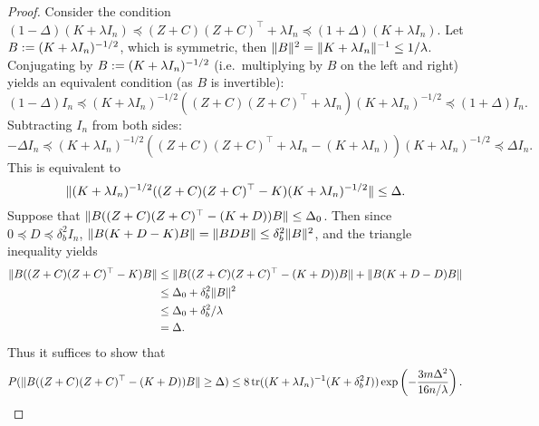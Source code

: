 \begin{proof}
  Consider the condition $(1 - \Delta)(K + \lambda I_n) \preceq (Z + C) (Z + C)^\top + \lambda I_n \preceq (1 +
  \Delta)(K + \lambda I_n)$.
  Let $B := (K + \lambda I_n)^{-1/2}$, which is symmetric, then $\|B\|^2 =
  \|K + \lambda I_n\|^{-1} \leq 1/\lambda$.
  Conjugating by $B := (K + \lambda I_n)^{-1/2}$ (i.e.\ multiplying by $B$ on the
  left and right) yields an equivalent condition (as $B$ is
  invertible):
  \begin{equation*}
    (1 - \Delta) I_n \preceq (K + \lambda I_n)^{-1/2} ((Z + C) (Z + C)^\top + \lambda I_n) (K + \lambda I_n)^{-1/2} \preceq (1 +
    \Delta) I_n.
  \end{equation*}
  Subtracting $I_n$ from both sides:
  \begin{equation*}
    -\Delta I_n \preceq (K + \lambda I_n)^{-1/2} ((Z + C) (Z + C)^\top + \lambda I_n - (K + \lambda I_n)) (K + \lambda
    I_n)^{-1/2} \preceq \Delta I_n.
  \end{equation*}
  This is equivalent to
  \begin{equation*}
    \|(K + \lambda I_n)^{-1/2} ((Z + C) (Z + C)^\top - K) (K + \lambda I_n)^{-1/2}\| \leq \Delta.
  \end{equation*}
  Suppose that $\|B((Z + C)(Z + C)^\top - (K + D))B\| \leq \Delta_0$.
  Then since $0 \preceq D \preceq \delta^2_b I_n$, $\|B(K + D - K) B\| = \|B D B\| \leq \delta^2_b
  \|B\|^2$, and the triangle inequality yields
  \begin{align*}
    \|B((Z + C)(Z + C)^\top - K)B\|
    &\leq \|B((Z + C)(Z + C)^\top - (K + D))B\| + \|B (K + D - D)B\| \\
    &\leq \Delta_0 + \delta^2_b \|B\|^2 \\
    &\leq \Delta_0 + \delta^2_b/\lambda \\
    &= \Delta.
  \end{align*}
  Thus it suffices to show that
  \begin{equation*}
    P(\|B((Z + C)(Z + C)^\top - (K + D))B\| \geq \Delta) \leq 8 \mathop{\rm tr}((K + \lambda I_n)^{-1} (K +
    \delta^2_b I)) \exp \left( -\frac{3m \Delta^2}{16n/\lambda} \right).
  \end{equation*}


\end{proof}
